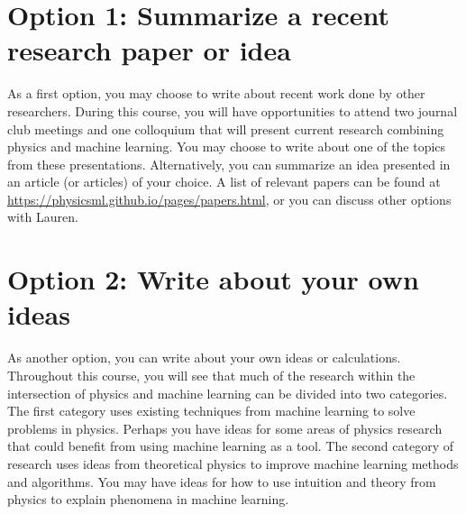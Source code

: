 \documentclass[letterpaper]{scrartcl}
\begin{document}
\section*{Option 1: Summarize a recent research paper or idea}
\vspace{-3mm}As a first option, you may choose to write about recent work done by other researchers.
During this course, you will have opportunities to attend 
two journal club meetings and one colloquium 
that will present current research combining physics and machine learning.
You may choose to write about one of the topics from these presentations.
Alternatively, you can summarize an idea presented in an article (or articles) of your choice.
A list of relevant papers can be found at
{\small\url{https://physicsml.github.io/pages/papers.html}},
or you can discuss other options with Lauren.

\section*{Option 2: Write about your own ideas}
\vspace{-3mm}As another option, you can write about your own ideas or calculations. 
Throughout this course, you will see that much of the research within the intersection of physics and machine learning
can be divided into two categories.
The first category uses existing techniques from machine learning to solve problems in physics.
Perhaps you have ideas for some areas of physics research that could benefit from using machine learning as a tool.
The second category of research uses ideas from theoretical physics to improve machine learning methods and algorithms.  
You may have ideas for how to use intuition and theory from physics to explain phenomena in machine learning.
\end{document}
